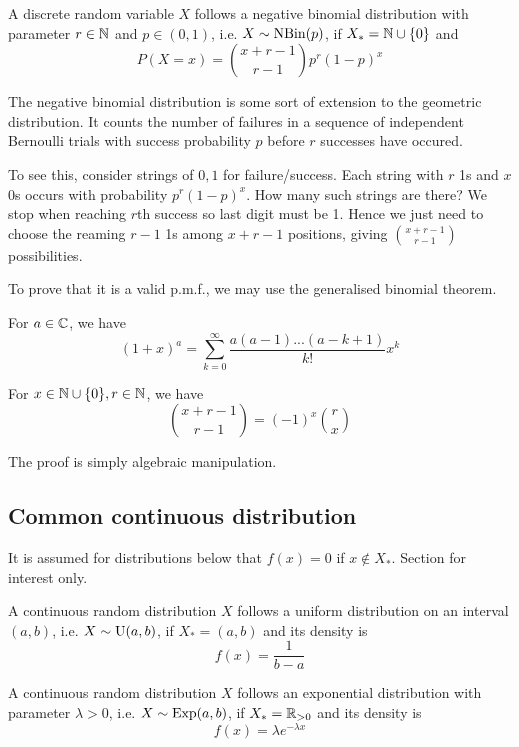 \documentclass[11pt]{article}
\begin{document}
\begin{definition}
  A discrete random variable \(X\) follows a negative binomial distribution with parameter \(r\in\N\) and \(p\in(0,1)\), i.e. \(X\sim \rm{NBin}(p)\), if \(X_*=\N\cup\{0\}\) and
  \[P(X=x)=\binom{x+r-1}{r-1}p^r(1-p)^x\]
\end{definition}
The negative binomial distribution is some sort of extension to the geometric distribution. It counts the number of failures in a sequence of independent Bernoulli trials with success probability \(p\) before \(r\) successes have occured.

\vspace{5pt}To see this, consider strings of \(0,1\) for failure/success. Each string with \(r\) 1s and \(x\) 0s occurs with probability \(p^r(1-p)^x\). How many such strings are there? We stop when reaching \(r\)th success so last digit must be 1. Hence we just need to choose the reaming \(r-1\) 1s among \(x+r-1\) positions, giving \(\binom{x+r-1}{r-1}\) possibilities.

\vspace{5pt}To prove that it is a valid p.m.f., we may use the generalised binomial theorem.
\begin{theorem}
  For \(a\in\C\), we have
  \[(1+x)^a=\sum_{k=0}^\infty\frac{a(a-1)...(a-k+1)}{k!}x^k\]
\end{theorem}
\begin{lemma}
  For \(x\in\N\cup\{0\},r\in\N\), we have
  \[\binom{x+r-1}{r-1}=(-1)^x\binom{r}{x}\]
\end{lemma}
The proof is simply algebraic manipulation.

\subsection{Common continuous distribution}

It is assumed for distributions below that \(f(x)=0\) if \(x\notin X_*\). Section for interest only.
\begin{definition}
  A continuous random distribution \(X\) follows a uniform distribution on an interval \((a,b)\), i.e. \(X\sim \rm{U} (a,b)\), if \(X_*=(a,b)\) and its density is 
  \[f(x)=\frac{1}{b-a}\]
\end{definition}

\begin{definition}
  A continuous random distribution \(X\) follows an exponential distribution with parameter \(\lambda >0\), i.e. \(X\sim \rm{Exp}(a,b)\), if \(X_*=\R_{>0}\) and its density is 
  \[f(x)=\lambda e^{-\lambda x}\]
\end{definition}
\end{document}
